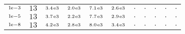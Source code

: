 \begin{tiny}
\begin{tabular}{@{$\;$}c@{$\;$}|@{$\;$}c@{$\;$}@{$\;$}c@{$\;$}@{$\;$}c@{$\;$}@{$\;$}c@{$\;$}@{$\;$}c@{$\;$}|@{$\;$}c@{$\;$}@{$\;$}c@{$\;$}@{$\;$}c@{$\;$}@{$\;$}c@{$\;$}@{$\;$}c@{$\;$}}
$\scriptstyle1\!\mathrm{\hspace{0.10em}e}-3$ & $\scriptstyle13$ & $\scriptstyle3.4\mathrm{\hspace{0.10em}e}3$ & $\scriptstyle2.0\mathrm{\hspace{0.10em}e}3$ & $\scriptstyle7.1\mathrm{\hspace{0.10em}e}3$ & $\scriptstyle2.6\mathrm{\hspace{0.10em}e}3$ & $\scriptstyle.$ & $\scriptstyle.$ & $\scriptstyle.$ & $\scriptstyle.$ & $\scriptstyle.$\\ 
$\scriptstyle1\!\mathrm{\hspace{0.10em}e}-5$ & $\scriptstyle13$ & $\scriptstyle3.7\mathrm{\hspace{0.10em}e}3$ & $\scriptstyle2.2\mathrm{\hspace{0.10em}e}3$ & $\scriptstyle7.7\mathrm{\hspace{0.10em}e}3$ & $\scriptstyle2.9\mathrm{\hspace{0.10em}e}3$ & $\scriptstyle.$ & $\scriptstyle.$ & $\scriptstyle.$ & $\scriptstyle.$ & $\scriptstyle.$\\ 
$\scriptstyle1\!\mathrm{\hspace{0.10em}e}-8$ & $\scriptstyle13$ & $\scriptstyle4.2\mathrm{\hspace{0.10em}e}3$ & $\scriptstyle2.8\mathrm{\hspace{0.10em}e}3$ & $\scriptstyle8.0\mathrm{\hspace{0.10em}e}3$ & $\scriptstyle3.4\mathrm{\hspace{0.10em}e}3$ & $\scriptstyle.$ & $\scriptstyle.$ & $\scriptstyle.$ & $\scriptstyle.$ & $\scriptstyle.$\\ 
\end{tabular} 
\end{tiny} 
